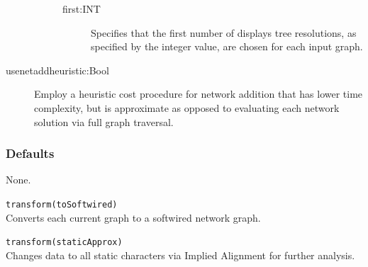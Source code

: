 \begin{description}
\begin{description}
\begin{description}
				\item[first:INT] Specifies that the first number of displays tree resolutions, as 
				specified by the integer value, are chosen for each input graph. 
			
			\end{description}
					
		\end{description}
		
		
		\item[usenetaddheuristic:Bool] Employ a heuristic cost procedure for network addition 
		that has lower time complexity, but is approximate as opposed to evaluating each network 
		solution via full graph traversal.
		
		
	\end{description}
			
	\subsubsection{Defaults}
		None.
		
	\begin{example}
	
		\item{\texttt{transform(toSoftwired)}\\Converts each current graph to a softwired network graph.}
					
		\item{\texttt{transform(staticApprox)}\\Changes data to all static characters via Implied Alignment 
		for further analysis.}		
			
	\end{example}
	
